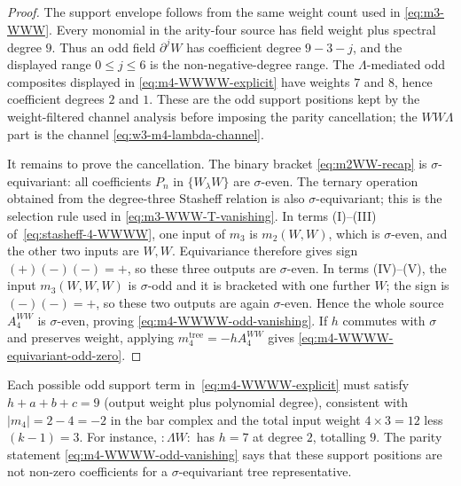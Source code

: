 \begin{proof}
The support envelope follows from the same weight count used in
\eqref{eq:m3-WWW}.  Every monomial in the arity-four source has
field weight plus spectral degree \(9\).  Thus an odd field
\(\partial^jW\) has coefficient degree \(9-3-j\), and the displayed
range \(0\leq j\leq6\) is the non-negative-degree range.  The
\(\Lambda\)-mediated odd composites displayed in
\eqref{eq:m4-WWWW-explicit} have weights \(7\) and \(8\), hence
coefficient degrees \(2\) and \(1\).  These are the odd support
positions kept by the weight-filtered channel analysis before imposing
the parity cancellation; the \(WW\Lambda\) part is the channel
\eqref{eq:w3-m4-lambda-channel}.

It remains to prove the cancellation.  The binary bracket
\eqref{eq:m2WW-recap} is \(\sigma\)-equivariant: all coefficients
\(P_n\) in \(\{W_\lambda W\}\) are \(\sigma\)-even.  The ternary
operation obtained from the degree-three Stasheff relation is also
\(\sigma\)-equivariant; this is the selection rule used in
\eqref{eq:m3-WWW-T-vanishing}.  In terms
\textup{(I)}--\textup{(III)} of~\eqref{eq:stasheff-4-WWWW}, one input
of \(m_3\) is \(m_2(W,W)\), which is \(\sigma\)-even, and the other two
inputs are \(W,W\).  Equivariance therefore gives sign
\((+)(-)(-)=+\), so these three outputs are \(\sigma\)-even.  In
terms \textup{(IV)}--\textup{(V)}, the input \(m_3(W,W,W)\) is
\(\sigma\)-odd and it is bracketed with one further \(W\); the sign is
\((-)(-)=+\), so these two outputs are again \(\sigma\)-even.  Hence
the whole source \(A_4^{WW}\) is \(\sigma\)-even, proving
\eqref{eq:m4-WWWW-odd-vanishing}.  If \(h\) commutes with \(\sigma\)
and preserves weight, applying \(m_4^{\mathrm{tree}}=-hA_4^{WW}\)
gives \eqref{eq:m4-WWWW-equivariant-odd-zero}.
\end{proof}

\begin{remark}
\label{rem:m4-weight-count}
Each possible odd support term in~\eqref{eq:m4-WWWW-explicit} must satisfy
$h + a + b + c = 9$ (output weight plus polynomial degree),
consistent with $|m_4| = 2 - 4 = -2$ in the bar complex
and the total input weight $4 \times 3 = 12$ less $(k-1)=3$.
For instance, ${:}\Lambda W{:}$ has $h = 7$ at degree \(2\), totalling
\(9\).  The parity statement
\eqref{eq:m4-WWWW-odd-vanishing} says that these support positions
are not non-zero coefficients for a \(\sigma\)-equivariant tree
representative.
\end{remark}

